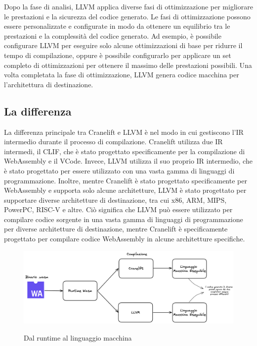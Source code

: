 Dopo la fase di analisi, LLVM applica diverse fasi di ottimizzazione per migliorare le prestazioni e la sicurezza del
codice generato. Le fasi di ottimizzazione possono essere personalizzate e configurate in modo da ottenere un equilibrio
tra le prestazioni e la complessità del codice generato. Ad esempio, è possibile configurare LLVM per eseguire solo
alcune ottimizzazioni di base per ridurre il tempo di compilazione, oppure è possibile configurarlo per applicare un set
completo di ottimizzazioni per ottenere il massimo delle prestazioni possibili. Una volta completata la fase di
ottimizzazione, LLVM genera codice macchina per l'architettura di destinazione.

\subsection{La differenza}
La differenza principale tra Cranelift e LLVM è nel modo in cui gestiscono l'IR intermedio durante il processo di
compilazione. Cranelift utilizza due IR intermedi, il CLIF, che è stato progettato specificamente per la compilazione di
WebAssembly e il VCode. Invece, LLVM utilizza il suo proprio IR intermedio, che è stato progettato per essere utilizzato
con una vasta gamma di linguaggi di programmazione. Inoltre, mentre Cranelift è stato progettato specificamente per
WebAssembly e supporta solo alcune architetture, LLVM è stato progettato per supportare diverse architetture di
destinazione, tra cui x86, ARM, MIPS, PowerPC, RISC-V e altre. Ciò significa che LLVM può essere utilizzato per
compilare codice sorgente in una vasta gamma di linguaggi di programmazione per diverse architetture di destinazione,
mentre Cranelift è specificamente progettato per compilare codice WebAssembly in alcune architetture specifiche.

\begin{figure}[H]
    \centering
    \captionsetup{justification=centering}
    \includegraphics[width=15cm]{./chapters/2.wasi-in-depth/images/11.runtime_to_machine.png}
    \label{runtime_to_machine_code}
    \caption{Dal runtime al linguaggio macchina}
\end{figure}

